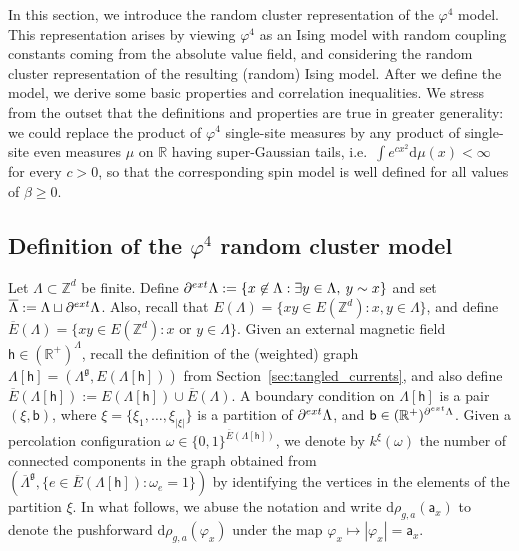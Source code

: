 \documentclass[11pt,a4paper]{article}
\theoremstyle{definition}
\numberwithin{equation}{section}
\newcommand\fg{\mathfrak{g}}
\begin{document}
In this section, we introduce the random cluster representation of the $\varphi^4$ model. This representation arises by viewing $\varphi^4$ as an Ising model with random coupling constants coming from the absolute value field, and considering the random cluster representation of the resulting (random) Ising model. After we define the model, we derive some basic properties and correlation inequalities. We stress from the outset that the definitions and properties are true in greater generality: we could replace the product of $\varphi^4$ single-site measures by any product of single-site even measures $\mu$ on $\mathbb{R}$ having super-Gaussian tails, i.e.\ $\int e^{cx^2} \mathrm{d}\mu(x) <\infty$ for every $c>0$, so that the corresponding spin model is well defined for all values of $\beta\geq 0$.

\subsection{Definition of the $\varphi^4$ random cluster model}



Let $\Lambda\subset \mathbb Z^d$ be finite. Define $\partial^{\rm ext} \Lambda:=\{x\not \in \Lambda: \exists y\in \Lambda, \: y\sim x\}$ and set $\overline \Lambda := \Lambda \sqcup \partial^{\rm ext} \Lambda$. Also, recall that $E(\Lambda )= \{ xy \in  E(\mathbb Z^d) : x,y \in \Lambda\}$, and define $\overline E(\Lambda) = \{ xy \in E(\mathbb Z^d) : x\text{ or }y \in \Lambda \}$. 
Given an external magnetic field $\mathsf h \in (\mathbb R^+)^\Lambda$, recall the definition of the (weighted) graph $\Lambda[\mathsf h]=(\Lambda^\fg,E(\Lambda[\mathsf h]))$ from Section~\ref{sec:tangled_currents}, and also define $\overline E(\Lambda[\mathsf h]):=E(\Lambda[\mathsf h])\cup \overline{E}(\Lambda)$.
A boundary condition on $\Lambda[\mathsf h]$ is a pair $(\xi, \mathsf b)$, where $\xi=\{\xi_1,\ldots,\xi_{|\xi|}\}$ is a partition of $\partial^{\rm ext} \Lambda$, and $\mathsf{b}\in (\mathbb R^+)^{\partial^{\rm ext} \Lambda}$. Given a percolation configuration $\omega \in \{0,1\}^{\overline E(\Lambda[\mathsf h])}$, we denote by $k^\xi(\omega)$ the number of connected components in the graph obtained from  $(\overline{\Lambda}^{\mathfrak g}, \{ e \in\overline E(\Lambda[\mathsf h]):\omega_e=1\})$ by identifying the vertices in the elements of the partition $\xi$. In what follows, we abuse the notation and write $\mathrm{d}\rho_{g,a}(\mathsf a_x)$ to denote the pushforward $\mathrm d \rho_{g,a}(\varphi_x)$ under the map $\varphi_x\mapsto |\varphi_x|=\mathsf a_x$.
\end{document}
